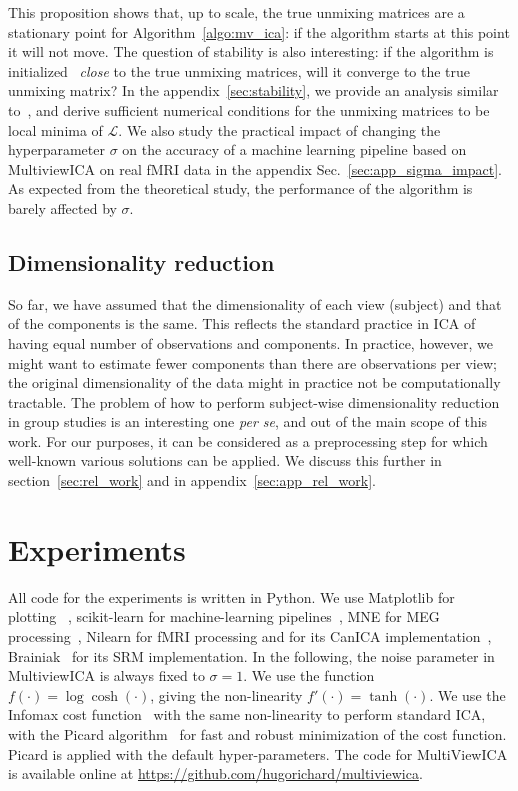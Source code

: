 \documentclass{report}
\begin{document}
This proposition shows that, up to scale, the true unmixing matrices are a stationary point for Algorithm~\ref{algo:mv_ica}: if the algorithm starts at this point it will not move.
%
The question of stability is also interesting: if the algorithm is initialized ~\emph{close} to the true unmixing matrices, will it converge to the true unmixing matrix?
%
In the appendix~\ref{sec:stability}, we provide an analysis similar to~\cite{cardoso1998blind}, and derive sufficient numerical conditions for the unmixing matrices to be local minima of $\mathcal{L}$.
%
We also study the practical impact of changing the hyperparameter $\sigma$ on the accuracy of a machine learning pipeline based on MultiviewICA on real fMRI data in the appendix Sec.~\ref{sec:app_sigma_impact}.
%
As expected from the theoretical study, the performance of the algorithm is barely affected by $\sigma$.
\subsection{Dimensionality reduction}
%
So far, we have assumed that the dimensionality of each view (subject) and that of the components is the same. This reflects the standard practice in ICA of having equal number of observations and components. 
%
In practice, however, we might want to estimate fewer components than there are observations per view; the original dimensionality of the data %
might in practice not be computationally tractable.
%
The problem of how to perform subject-wise dimensionality reduction in group studies 
is an interesting one \emph{per se}, and out of the main scope of this work. For our purposes, it can be considered as a preprocessing step for which well-known various solutions can be applied. %
We discuss this further in section~\ref{sec:rel_work} and in appendix~\ref{sec:app_rel_work}.
%
%
%
%
%
\section{Experiments}
\label{sec:expts}
All code for the experiments is written in Python.
%
We use Matplotlib for plotting~\cite{hunter2007matplotlib} , scikit-learn for
machine-learning pipelines~\cite{pedregosa2011scikit}, MNE for MEG
processing~\cite{gramfort2013meg}, Nilearn for fMRI processing and for its CanICA implementation~\cite{abraham2014machine}, Brainiak~\cite{kumar2020brainiak} for its SRM implementation. 
%
In the following, the noise parameter in MultiviewICA is always fixed to $\sigma =1$.
%
We use the function $f(\cdot)= \log\cosh(\cdot)$, giving the non-linearity $f'(\cdot) = \tanh(\cdot)$.
%
We use the Infomax cost function~\cite{bell1995information} with the same non-linearity to perform standard ICA, with the Picard algorithm~\cite{ablin2018faster} for fast and robust minimization of the cost function. Picard is applied with the default hyper-parameters.
%
The code for MultiViewICA is available online at \url{https://github.com/hugorichard/multiviewica}.
%
\end{document}

